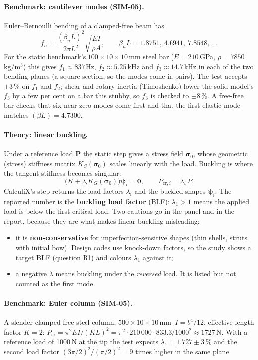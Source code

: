 \paragraph{Benchmark: cantilever modes (SIM-05).} Euler--Bernoulli bending of a clamped-free beam has
\[
  f_n=\frac{(\beta_nL)^2}{2\pi L^2}\sqrt{\frac{EI}{\rho A}},\qquad
  \beta_nL=1.8751,\ 4.6941,\ 7.8548,\ \dots
\]
For the static benchmark's $100\times10\times10$\,mm steel bar ($E=210$\,GPa, $\rho=7850$\,kg/m$^3$) this
gives $f_1\approx837$\,Hz, $f_2\approx5.25$\,kHz and $f_3\approx14.7$\,kHz in each of the two bending planes
(a square section, so the modes come in pairs). The test accepts $\pm3$\,\% on $f_1$ and $f_2$; shear and
rotary inertia (Timoshenko) lower the solid model's $f_3$ by a few per cent on a bar this stubby, so $f_3$ is
checked to $\pm8$\,\%. A free-free bar checks that six near-zero modes come first and that the first elastic
mode matches $(\beta L)=4.7300$.

\paragraph{Theory: linear buckling.} Under a reference load $\mathbf P$ the static step gives a stress field
$\boldsymbol\sigma_0$, whose geometric (stress) stiffness matrix $K_G(\boldsymbol\sigma_0)$ scales linearly
with the load. Buckling is where the tangent stiffness becomes singular:
\[
  \bigl(K+\lambda_i K_G(\boldsymbol\sigma_0)\bigr)\boldsymbol\psi_i=\mathbf 0,\qquad
  P_{\text{cr},i}=\lambda_i\,P .
\]
CalculiX's  step returns the load factors $\lambda_i$ and the buckled shapes $\boldsymbol\psi_i$.
The reported number is the \textbf{buckling load factor} (BLF): $\lambda_1>1$ means the applied load is below
the first critical load. Two cautions go in the panel and in the report, because they are what makes linear
buckling misleading:
\begin{itemize}
  \item it is \textbf{non-conservative} for imperfection-sensitive shapes (thin shells, struts with initial
        bow). Design codes use knock-down factors, so the study shows a target BLF (question B1) and colours
        $\lambda_1$ against it;
  \item a negative $\lambda$ means buckling under the \emph{reversed} load. It is listed but not counted as
        the first mode.
\end{itemize}

\paragraph{Benchmark: Euler column (SIM-05).} A slender clamped-free steel column, $500\times10\times10$\,mm,
$I=b^4/12$, effective length factor $K=2$:
$P_{\text{cr}}=\pi^2EI/(KL)^2=\pi^2\cdot210\,000\cdot833.3/1000^2\approx1727$\,N. With a reference load of
1000\,N at the tip the test expects $\lambda_1=1.727\pm3\,\%$ and the second load factor $(3\pi/2)^2/(\pi/2)^2=9$
times higher in the same plane.

